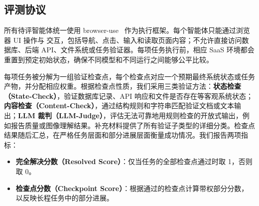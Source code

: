 \subsection{评测协议}
\label{saas-eval}

所有待评智能体统一使用 browser-use~\cite{browseruse} 作为执行框架。每个智能体只能通过浏览器 UI 操作与 \datasetname 交互，包括导航、点击、输入和读取页面内容；不允许直接访问数据库、后端 API、文件系统或任务验证器。每项任务执行前，相应 SaaS 环境都会重置到预定初始状态，确保不同模型和不同运行之间能够公平比较。

每项任务被分解为一组验证检查点，每个检查点对应一个预期最终系统状态或任务产物，并分配相应权重。根据检查点性质，我们采用三类验证方法：\textbf{状态检查（State-Check）}，验证数据库记录、API 响应和文件是否存在等客观系统状态；\textbf{内容检查（Content-Check）}，通过结构规则和字符串匹配验证文档或文本输出；\textbf{LLM 裁判（LLM-Judge）}，评估无法可靠地用规则检查的开放式输出，例如报告质量或图像理解结果。补充材料提供了所有验证子类型的详细分类。检查点结果随后汇总，在严格任务层面和部分进展层面衡量成功情况。我们报告两项指标：
\begin{itemize}
  \item \textbf{完全解决分数（Resolved Score）}：仅当任务的全部检查点通过时取 1，否则取 0。
  \item \textbf{检查点分数（Checkpoint Score）}：根据通过的检查点计算带权部分分数，以反映长程任务中的部分进展。
\end{itemize}
